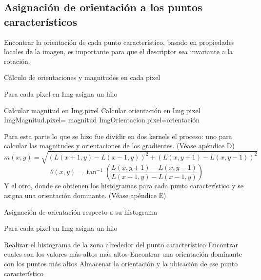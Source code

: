 \subsection{Asignación de orientación a los puntos característicos}
Encontrar la orientación de cada punto característico, basado en propiedades locales de la imagen, es importante para que el descriptor sea invariante a la rotación.\\
\begin{algorithm}[H]
\caption{Cálculo de orientaciones y magnitudes en cada pixel}
 Para cada pixel en Img asigna un hilo\;
 
 {
	Calcular magnitud en Img.pixel\;
	Calcular orientación en Img.pixel\;
	ImgMagnitud.pixel= magnitud\;
	ImgOrientacion.pixel=orientación\;
	
}
\end{algorithm}
Para esta parte lo que se hizo fue dividir en dos kernels el proceso: uno para calcular las magnitudes y orientaciones de los gradientes. (Véase apéndice D)
$$m(x,y) = \sqrt{ (L(x+1,y)-L(x-1,y))^2 + (L(x,y+1)-L(x,y-1))^2 }$$		
$$\theta(x,y) =  \tan^{-1} \left(\frac{L(x,y+1)-L(x,y-1)}{L(x+1,y)-L(x-1,y)}\right)$$
Y el otro, donde se obtienen los histogramas para cada punto característico y se asigna una orientación dominante. (Véase apéndice E)\\
\begin{algorithm}[H]
\caption{Asignación de orientación respecto a su histograma}
 Para cada pixel en Img asigna un hilo\;
 
 {
	{
		Realizar el histograma de la zona alrededor del punto característico\;
		Encontrar cuales son los valores más altos más altos\;
		Encontrar una orientación dominante con los puntos más altos\;
		Almacenar la orientación y la ubicación de ese punto característico\; 
	
	}
}
\end{algorithm}
